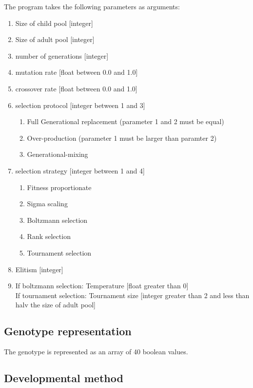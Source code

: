\documentclass[11pt]{article}
\begin{document}
The program takes the following parameters as arguments:
\begin{enumerate}
\renewcommand{\theenumii}{\arabic{enumii}}
\item Size of child pool [integer]
\item Size of adult pool [integer]
\item number of generations [integer]
\item mutation rate [float between 0.0 and 1.0]
\item crossover rate [float between 0.0 and 1.0]
\item selection protocol [integer between 1 and 3]
   \begin{enumerate}
   \item Full Generational replacement (parameter 1 and 2 must be equal)
   \item Over-production (parameter 1 must be larger than paramter 2)
   \item Generational-mixing
   \end{enumerate}
\item selection strategy [integer between 1 and 4]
   \begin{enumerate}
   \item Fitness proportionate
   \item Sigma scaling
   \item Boltzmann selection
   \item Rank selection
   \item Tournament selection
   \end{enumerate}
\item Elitism [integer]
\item If boltzmann selection: Temperature [float greater than 0]\\
      If tournament selection: Tournament size [integer greater than 2 and less than halv the size of adult pool]

\end{enumerate}

\subsection*{Genotype representation}

The genotype is represented as an array of 40 boolean values.

\subsection*{Developmental method}
\end{document}
